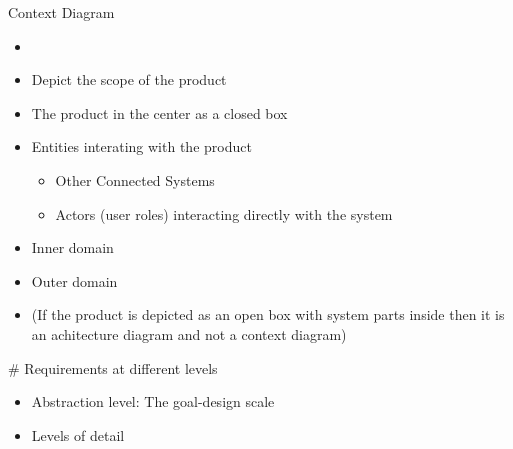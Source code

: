 
\begin{Slide}{Context Diagram}

\begin{itemize}
\item \TODO{}
\item Depict the scope of the product
\item The product in the center as a closed box
\item Entities interating with the product
\begin{itemize}
\item Other Connected Systems
\item Actors (user roles) interacting directly with the system
\end{itemize}
\item Inner domain
\item Outer domain
\item (If the product is depicted as an open box with system parts inside then it is an achitecture diagram and not a context diagram)


\end{itemize}
# Requirements at different levels

\begin{itemize}
\item Abstraction level: The goal-design scale
\item Levels of detail

\end{itemize}

\end{Slide}

